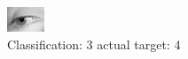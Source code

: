 \begin{figure}[h!]
\begin{center}
\includegraphics[width=0.60\columnwidth]{figures/ID3004_class_3_target_4.png}
\end{center}
\caption{ Classification: 3 actual target: 4}
\label{fig:ID3004_class_3_target_4}
\end{figure}
